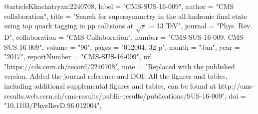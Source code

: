 @article{Khachatryan:2240708,
      label          = "CMS-SUS-16-009",
      author        = "{CMS collaboration}",
      title         = "{Search for supersymmetry in the all-hadronic final state
                       using top quark tagging in pp collisions at $\sqrt{s}$ = 13
                       TeV}",
      journal       = "Phys. Rev. D",
      collaboration = "CMS Collaboration",
      number        = "CMS-SUS-16-009. CMS-SUS-16-009",
      volume        = "96",
      pages         = "012004. 32 p",
      month         = "Jan",
      year          = "2017",
      reportNumber  = "CMS-SUS-16-009",
      url           = "https://cds.cern.ch/record/2240708",
      note          = "Replaced with the published version. Added the journal
                       reference and DOI. All the figures and tables, including
                       additional supplemental figures and tables, can be found at
                       http://cms-results.web.cern.ch/cms-results/public-results/publications/SUS-16-009",
      doi           = "10.1103/PhysRevD.96.012004",
}

